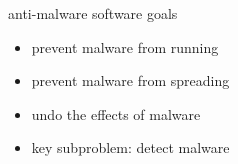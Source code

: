 
\begin{frame}{anti-malware software goals}
    \begin{itemize}
    \item prevent malware from running
    \item prevent malware from spreading
    \item undo the effects of malware
    \vspace{.5cm}
    \item<2-> key subproblem: detect malware
    \end{itemize}
\end{frame}

